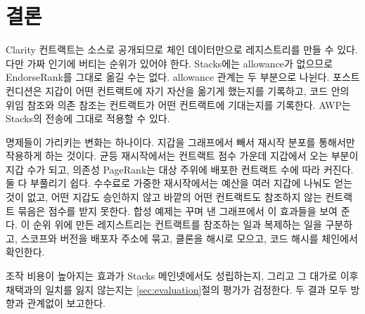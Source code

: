 \section{결론}
\label{sec:conclusion}

Clarity 컨트랙트는 소스로 공개되므로 체인 데이터만으로 레지스트리를 만들 수 있다. 다만 가짜 인기에 버티는 순위가 있어야 한다. Stacks에는 allowance가 없으므로 EndorseRank를 그대로 옮길 수는 없다. allowance 관계는 두 부분으로 나뉜다. 포스트컨디션은 지갑이 어떤 컨트랙트에 자기 자산을 옮기게 했는지를 기록하고, 코드 안의 위임 참조와 의존 참조는 컨트랙트가 어떤 컨트랙트에 기대는지를 기록한다. AWP는 Stacks의 전송에 그대로 적용할 수 있다.

명제들이 가리키는 변화는 하나이다. 지갑을 그래프에서 빼서 재시작 분포를 통해서만 작용하게 하는 것이다. 균등 재시작에서는 컨트랙트 점수 가운데 지갑에서 오는 부분이 지갑 수가 되고, 의존성 PageRank는 대상 주위에 배포한 컨트랙트 수에 따라 커진다. 둘 다 부풀리기 쉽다. 수수료로 가중한 재시작에서는 예산을 여러 지갑에 나눠도 얻는 것이 없고, 어떤 지갑도 승인하지 않고 바깥의 어떤 컨트랙트도 참조하지 않는 컨트랙트 묶음은 점수를 받지 못한다. 합성 예제는 꾸며 낸 그래프에서 이 효과들을 보여 준다. 이 순위 위에 만든 레지스트리는 컨트랙트를 참조하는 일과 복제하는 일을 구분하고, 스코프와 버전을 배포자 주소에 묶고, 클론을 해시로 모으고, 코드 해시를 체인에서 확인한다.

조작 비용이 높아지는 효과가 Stacks 메인넷에서도 성립하는지, 그리고 그 대가로 이후 채택과의 일치를 잃지 않는지는 \ref{sec:evaluation}절의 평가가 검정한다. 두 결과 모두 방향과 관계없이 보고한다.
